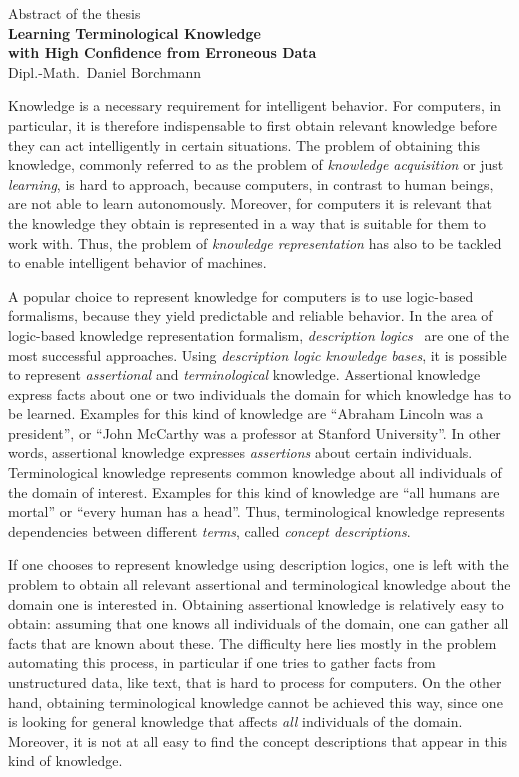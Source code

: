 \documentclass[english,fleqn]{scrartcl}
\begin{document}
\medskip
\begin{center}
  \normalsize Abstract of the thesis\\
  \LARGE\textbf{Learning Terminological Knowledge\\ with High Confidence from Erroneous
    Data}\\
  \bigskip%
  \large Dipl.-Math.\ Daniel Borchmann
\end{center}
\bigskip
\bigskip

\noindent
Knowledge is a necessary requirement for intelligent behavior.  For computers, in
particular, it is therefore indispensable to first obtain relevant knowledge before they
can act intelligently in certain situations.  The problem of obtaining this knowledge,
commonly referred to as the problem of \emph{knowledge acquisition} or just
\emph{learning}, is hard to approach, because computers, in contrast to human beings, are
not able to learn autonomously.  Moreover, for computers it is relevant that the knowledge
they obtain is represented in a way that is suitable for them to work with.  Thus, the
problem of \emph{knowledge representation} has also to be tackled to enable intelligent
behavior of machines.

A popular choice to represent knowledge for computers is to use logic-based formalisms,
because they yield predictable and reliable behavior.  In the area of logic-based
knowledge representation formalism, \emph{description logics}~\cite{DLhandbook} are one of
the most successful approaches.  Using \emph{description logic knowledge bases}, it is
possible to represent \emph{assertional} and \emph{terminological} knowledge.  Assertional
knowledge express facts about one or two individuals the domain for which knowledge has to
be learned.  Examples for this kind of knowledge are \enquote{Abraham Lincoln was a
  president}, or \enquote{John McCarthy was a professor at Stanford University}.  In other
words, assertional knowledge expresses \emph{assertions} about certain individuals.
Terminological knowledge represents common knowledge about all individuals of the domain
of interest.  Examples for this kind of knowledge are \enquote{all humans are mortal} or
\enquote{every human has a head}.  Thus, terminological knowledge represents dependencies
between different \emph{terms}, called \emph{concept descriptions}.

If one chooses to represent knowledge using description logics, one is left with the
problem to obtain all relevant assertional and terminological knowledge about the domain
one is interested in.  Obtaining assertional knowledge is relatively easy to obtain:
assuming that one knows all individuals of the domain, one can gather all facts that are
known about these.  The difficulty here lies mostly in the problem automating this
process, in particular if one tries to gather facts from unstructured data, like text,
that is hard to process for computers.  On the other hand, obtaining terminological
knowledge cannot be achieved this way, since one is looking for general knowledge that
affects \emph{all} individuals of the domain.  Moreover, it is not at all easy to find the
concept descriptions that appear in this kind of knowledge.
\end{document}
